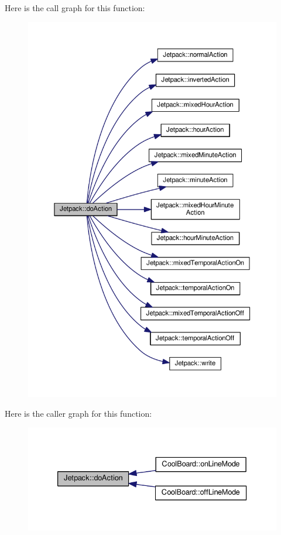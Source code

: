 Here is the call graph for this function\+:\nopagebreak
\begin{figure}[H]
\begin{center}
\leavevmode
\includegraphics[width=350pt]{class_jetpack_af9acedb606340c26c2636c282b54dff1_cgraph}
\end{center}
\end{figure}
Here is the caller graph for this function\+:\nopagebreak
\begin{figure}[H]
\begin{center}
\leavevmode
\includegraphics[width=333pt]{class_jetpack_af9acedb606340c26c2636c282b54dff1_icgraph}
\end{center}
\end{figure}
\mbox{\label{class_jetpack_acd6889af2fe5b057c6bd51b6dac827ef}} 
